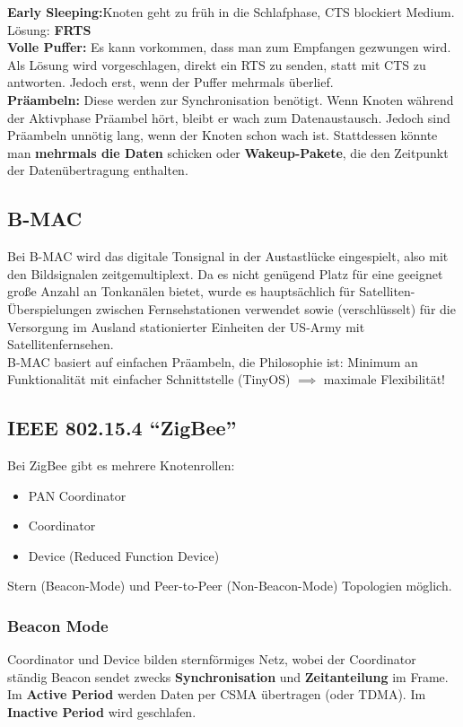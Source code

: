 \documentclass[a4paper]{article}
\begin{document}
\textbf{Early Sleeping:}Knoten geht zu früh in die Schlafphase, CTS blockiert Medium. Lösung: \textbf{FRTS}\\
\textbf{Volle Puffer:} Es kann vorkommen, dass man zum Empfangen gezwungen wird. Als Lösung wird vorgeschlagen, direkt ein RTS zu senden, statt mit CTS zu antworten. Jedoch erst, wenn der Puffer mehrmals überlief.\\

\textbf{Präambeln:} Diese werden zur Synchronisation benötigt. Wenn Knoten während der Aktivphase Präambel hört, bleibt er wach zum Datenaustausch. Jedoch sind Präambeln unnötig lang, wenn der Knoten schon wach ist. Stattdessen könnte man \textbf{mehrmals die Daten} schicken oder \textbf{Wakeup-Pakete}, die den Zeitpunkt der Datenübertragung enthalten.

\subsection{B-MAC}
Bei B-MAC wird das digitale Tonsignal in der Austastlücke eingespielt, also mit den Bildsignalen zeitgemultiplext. Da es nicht genügend Platz für eine geeignet große Anzahl an Tonkanälen bietet, wurde es hauptsächlich für Satelliten-Überspielungen zwischen Fernsehstationen verwendet sowie (verschlüsselt) für die Versorgung im Ausland stationierter Einheiten der US-Army mit Satellitenfernsehen. \\

B-MAC basiert auf einfachen Präambeln, die Philosophie ist: Minimum an Funktionalität mit einfacher Schnittstelle (TinyOS) $\implies$ maximale Flexibilität!

\subsection{IEEE 802.15.4 ``ZigBee''}
Bei ZigBee gibt es mehrere Knotenrollen:
\begin{itemize}
	\item PAN Coordinator
	\item Coordinator
	\item Device (Reduced Function Device)
\end{itemize}
Stern (Beacon-Mode) und Peer-to-Peer (Non-Beacon-Mode) Topologien möglich.
\subsubsection{Beacon Mode}
Coordinator und Device bilden sternförmiges Netz, wobei der Coordinator ständig Beacon sendet zwecks \textbf{Synchronisation} und \textbf{Zeitanteilung} im Frame.\\
Im \textbf{Active Period} werden Daten per CSMA übertragen (oder TDMA). Im \textbf{Inactive Period} wird geschlafen.
\end{document}
